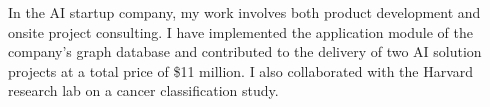 

\begin{cvparagraph}

In the AI startup company, my work involves both product development and onsite project consulting. I have implemented the application module of the company's graph database and contributed to the delivery of two AI solution projects at a total price of \$11 million. I also collaborated with the Harvard research lab on a cancer classification study.
\end{cvparagraph}
